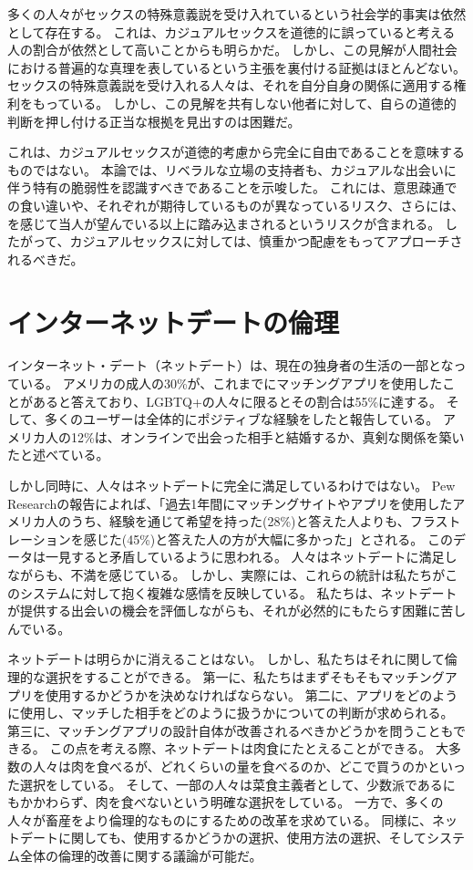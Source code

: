 \documentclass[paper=a4,book,openany]{jlreq}
\newcommand{\ig}[1]{}           %
\begin{document}
多くの人々がセックスの特殊意義説を受け入れているという社会学的事実は依然として存在する。
これは、カジュアルセックスを道徳的に誤っていると考える人の割合が依然として高いことからも明らかだ。
しかし、この見解が人間社会における普遍的な真理を表しているという主張を裏付ける証拠はほとんどない。
セックスの特殊意義説を受け入れる人々は、それを自分自身の関係に適用する権利をもっている。
しかし、この見解を共有しない他者に対して、自らの道徳的判断を押し付ける正当な根拠を見出すのは困難だ。

これは、カジュアルセックスが道徳的考慮から完全に自由であることを意味するものではない。
本論では、リベラルな立場の支持者も、カジュアルな出会いに伴う特有の脆弱性を認識すべきであることを示唆した。
これには、意思疎通での食い違いや、それぞれが期待しているものが異なっているリスク、さらには、を感じて当人が望んでいる以上に踏み込まされるというリスクが含まれる。
したがって、カジュアルセックスに対しては、慎重かつ配慮をもってアプローチされるべきだ。

\section{インターネットデートの倫理}

インターネット・デート（ネットデート）は、現在の独身者の生活の一部となっている。
アメリカの成人の30\%が、これまでにマッチングアプリを使用したことがあると答えており、LGBTQ+の人々に限るとその割合は55\%に達する。
そして、多くのユーザーは全体的にポジティブな経験をしたと報告している。
アメリカ人の12\%は、オンラインで出会った相手と結婚するか、真剣な関係を築いたと述べている\citep{anderson20:_virt_down_onlin_datin}。
\ig{Monica Anderson}

しかし同時に、人々はネットデートに完全に満足しているわけではない。
Pew Researchの報告によれば、「過去1年間にマッチングサイトやアプリを使用したアメリカ人のうち、経験を通じて希望を持った(28\%)と答えた人よりも、フラストレーションを感じた(45\%)と答えた人の方が大幅に多かった」とされる\citep{anderson20:_virt_down_onlin_datin}。
このデータは一見すると矛盾しているように思われる。
人々はネットデートに満足しながらも、不満を感じている。
しかし、実際には、これらの統計は私たちがこのシステムに対して抱く複雑な感情を反映している。
私たちは、ネットデートが提供する出会いの機会を評価しながらも、それが必然的にもたらす困難に苦しんでいる。

ネットデートは明らかに消えることはない。
しかし、私たちはそれに関して倫理的な選択をすることができる。
第一に、私たちはまずそもそもマッチングアプリを使用するかどうかを決めなければならない。
第二に、アプリをどのように使用し、マッチした相手をどのように扱うかについての判断が求められる。
第三に、マッチングアプリの設計自体が改善されるべきかどうかを問うこともできる。
この点を考える際、ネットデートは肉食にたとえることができる。
大多数の人々は肉を食べるが、どれくらいの量を食べるのか、どこで買うのかといった選択をしている。
そして、一部の人々は菜食主義者として、少数派であるにもかかわらず、肉を食べないという明確な選択をしている。
一方で、多くの人々が畜産をより倫理的なものにするための改革を求めている。
同様に、ネットデートに関しても、使用するかどうかの選択、使用方法の選択、そしてシステム全体の倫理的改善に関する議論が可能だ。
\end{document}
